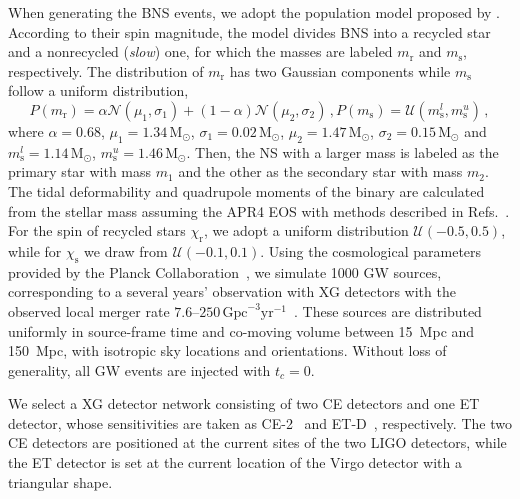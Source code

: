 \documentclass[a4paper,11pt]{article}
\begin{document}
When generating the BNS events, we adopt the population model proposed by \citet{Farrow:2019xnc}. 
According to their spin magnitude, the model divides BNS into a recycled star and a nonrecycled 
(\emph{slow}) one, for which the masses are labeled $m_{\mathrm{r}}$ and $m_{\mathrm{s}}$, respectively. 
The distribution of $m_{\mathrm{r}}$ has two Gaussian components while $m_{\mathrm{s}}$ follow a uniform distribution,
\begin{subequations}
\label{mass population}
\begin{equation}
    P(m_{\mathrm{r}}) = \alpha \mathcal{N}(\mu_1, \sigma_1) + (1-\alpha) \mathcal{N}(\mu_2, \sigma_2)\,,
\end{equation}
\begin{equation}
    P(m_{\mathrm{s}}) = \mathcal{U}(m_{\mathrm{s}}^l, m_{\mathrm{s}}^u)\,,
\end{equation}
\end{subequations}
where $\alpha=0.68$, $\mu_1=1.34\,\mathrm{M}_{\odot}$, $\sigma_1=0.02\,\mathrm{M}_
{\odot}$, $\mu_2=1.47\,\mathrm{M}_{\odot}$, $\sigma_2=0.15\,\mathrm{M}_{\odot}$ 
and $m_{\mathrm{s}}^l=1.14\,\mathrm{M}_{\odot}$, $m_{\mathrm{s}}^u=1.46\,\mathrm{M}_{\odot}$. Then, the NS with a larger mass is labeled as the primary star with mass $m_1$ and the other as the secondary star with mass $m_2$.
The tidal deformability and quadrupole moments of the binary are calculated from 
the stellar mass assuming the APR4 EOS with methods described in Refs.~\cite{Yagi:2013awa,Atta:2024ckt}. For the spin of recycled stars $\chi_{\mathrm{r}}$, we adopt a uniform distribution $\mathcal{U}(-0.5,0.5)$, 
while for $\chi_{\mathrm{s}}$ we draw from $\mathcal{U}(-0.1,0.1)$.
Using the cosmological parameters provided by the Planck Collaboration~\cite{Planck:2018vyg}, 
we simulate 1000 GW sources, corresponding to a several years' observation with XG detectors with the observed local merger rate 
$7.6$--$250\,\mathrm{Gpc}^{-3}\mathrm{yr}^{-1}$~\cite{LIGOScientific:2025pvj,LIGOScientific:2020aai}.
These sources are distributed uniformly in source-frame time and co-moving volume between 15~Mpc and 150~Mpc, 
with isotropic sky locations and orientations. Without loss of generality, all GW events are injected with $t_{c}=0$.

We select a XG detector network consisting of two CE detectors and one ET 
detector, whose sensitivities are taken as CE-2~\cite{Reitze:2019iox,Reitze:2019dyk} 
and ET-D~\cite{Punturo:2010zz,Hild:2010id,Sathyaprakash:2012jk}, respectively. 
The two CE detectors are positioned at the current sites of the two LIGO detectors, 
while the ET detector is set at the current location of the Virgo detector with a triangular shape. 
\end{document}
